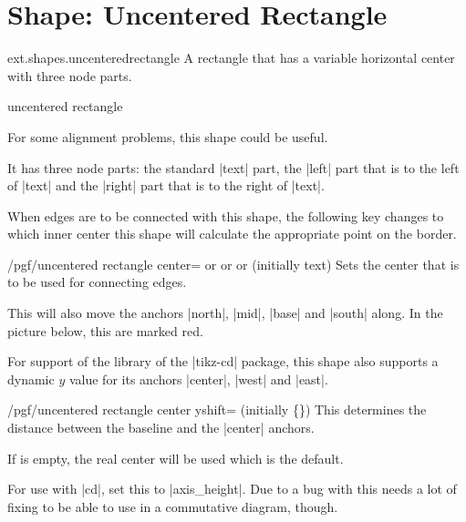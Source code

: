%
%
%

\section{Shape: Uncentered Rectangle}
\begin{pgflibrary}{ext.shapes.uncenteredrectangle}
  A rectangle that has a variable horizontal center with three node parts.
\end{pgflibrary}
\begin{shape}{uncentered rectangle}

For some alignment problems, this shape could be useful.

It has three node parts: the standard |text| part,
the |left| part that is to the left of |text|
and the |right| part that is to the right of |text|.

When edges are to be connected with this shape, the
following key changes to which inner center this shape will
calculate the appropriate point on the border.
\begin{key}{/pgf/uncentered rectangle center=\textrm{ or }\textrm{ or }\textrm{ or } (initially text)}
  Sets the center that is to be used for connecting edges.
  
  This will also move the anchors |north|, |mid|, |base| and |south| along.
  In the picture below, this are marked red.
\end{key}

For support of the  library of the |tikz-cd| package,
this shape also supports a dynamic $y$ value for its anchors |center|, |west| and |east|.
\begin{key}{/pgf/uncentered rectangle center yshift= (initially \{\})}
  This determines the distance between the baseline and the |center| anchors.
  
  If  is empty, the real center will be used which is the default.
  
  For use with |cd|, set this to |axis_height|.
  Due to a bug with 
  this needs a lot of fixing to be able to use in a commutative diagram, though.


\end{key}
\end{shape}
